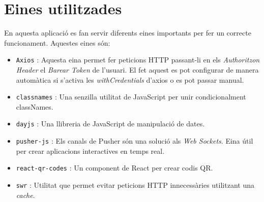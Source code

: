 \section{Eines utilitzades}

En aquesta aplicació es fan servir diferents eines importants per fer un correcte funcionament.
Aquestes eines són:

\begin{itemize}
    \item \texttt{Axios} \autocite{axios}: Aquesta eina permet fer peticions HTTP passant-li en els \emph{Authoritzon Header} el \emph{Barear Token} de l'usuari.
    El fet aquest es pot configurar de manera automàtica si s'activa les \emph{withCredentials} d'axios o es pot passar manual.
    \item \texttt{classnames} \autocite{classnames}: Una senzilla utilitat de JavaScript per unir condicionalment classNames.
    \item \texttt{dayjs} \autocite{dayjs}: Una llibreria de JavaScript de manipulació de dates.
    \item \texttt{pusher-js} \autocite{pusher}: Els canals de Pusher són una solució als \emph{Web Sockets}.
    Eina útil per crear aplicacions interactives en temps real.
    \item \texttt{react-qr-codes} \autocite{react_qr_code}: Un component de React per crear codis QR.
    \item \texttt{swr} \autocite{swr}: Utilitat que permet evitar peticions HTTP innecessàries utilitzant una \emph{cache}.
\end{itemize}
